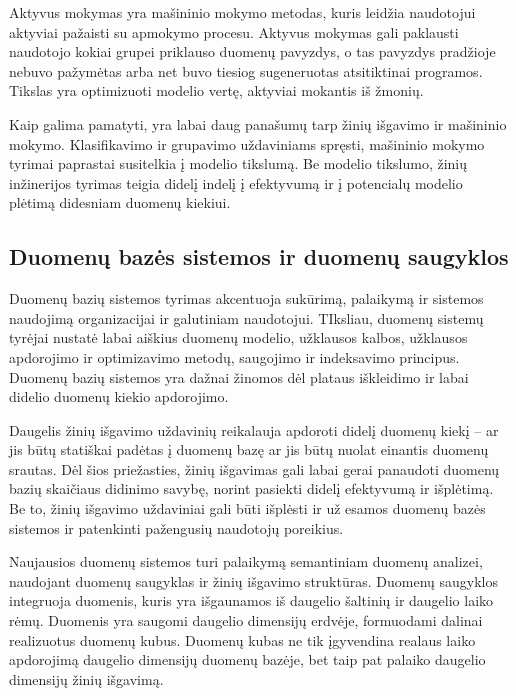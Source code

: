 Aktyvus mokymas yra mašininio mokymo metodas, kuris leidžia naudotojui aktyviai pažaisti su apmokymo procesu.
Aktyvus mokymas gali paklausti naudotojo kokiai grupei priklauso duomenų pavyzdys, o tas pavyzdys pradžioje nebuvo pažymėtas arba net buvo tiesiog sugeneruotas atsitiktinai programos.
Tikslas yra optimizuoti modelio vertę, aktyviai mokantis iš žmonių.

Kaip galima pamatyti, yra labai daug panašumų tarp žinių išgavimo ir mašininio mokymo.
Klasifikavimo ir grupavimo uždaviniams spręsti, mašininio mokymo tyrimai paprastai susitelkia į modelio tikslumą.
Be modelio tikslumo, žinių inžinerijos tyrimas teigia didelį indelį į efektyvumą ir į potencialų modelio plėtimą didesniam duomenų kiekiui.

\subsection{Duomenų bazės sistemos ir duomenų saugyklos}

Duomenų bazių sistemos tyrimas akcentuoja sukūrimą, palaikymą ir sistemos naudojimą organizacijai ir galutiniam naudotojui.
TIksliau, duomenų sistemų tyrėjai nustatė labai aiškius duomenų modelio, užklausos kalbos, užklausos apdorojimo ir optimizavimo metodų, saugojimo ir indeksavimo principus.
Duomenų bazių sistemos yra dažnai žinomos dėl plataus iškleidimo ir labai didelio duomenų kiekio apdorojimo.

Daugelis žinių išgavimo uždavinių reikalauja apdoroti didelį duomenų kiekį -- ar jis būtų statiškai padėtas į duomenų bazę ar jis būtų nuolat einantis duomenų srautas.
Dėl šios priežasties, žinių išgavimas gali labai gerai panaudoti duomenų bazių skaičiaus didinimo savybę, norint pasiekti didelį efektyvumą ir išplėtimą.
Be to, žinių išgavimo uždaviniai gali būti išplėsti ir už esamos duomenų bazės sistemos ir patenkinti pažengusių naudotojų poreikius.

Naujausios duomenų sistemos turi palaikymą semantiniam duomenų analizei, naudojant duomenų saugyklas ir žinių išgavimo struktūras.
Duomenų saugyklos integruoja duomenis, kuris yra išgaunamos iš daugelio šaltinių ir daugelio laiko rėmų.
Duomenis yra saugomi daugelio dimensijų erdvėje, formuodami dalinai realizuotus duomenų kubus.
Duomenų kubas ne tik įgyvendina realaus laiko apdorojimą daugelio dimensijų duomenų bazėje, bet taip pat palaiko daugelio dimensijų žinių išgavimą.
